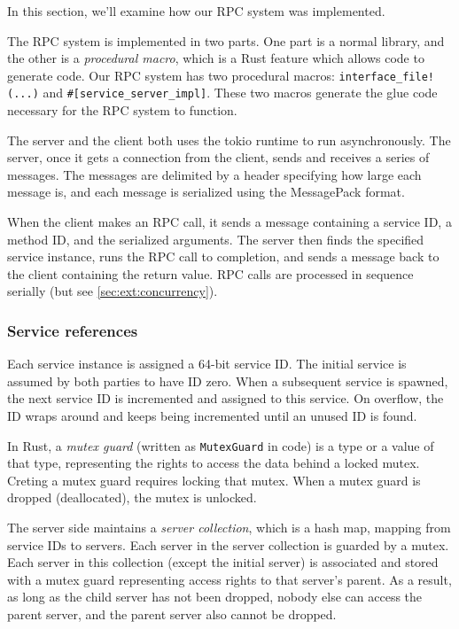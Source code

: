 \documentclass[11pt, twocolumn]{article}
\begin{document}
In this section, we'll examine how our RPC system was implemented.

The RPC system is implemented in two parts. One part is a normal library, and the other is a \textit{procedural macro}, which is a Rust feature which allows code to generate code. Our RPC system has two procedural macros: \texttt{interface\_file!(...)} and \texttt{\#[service\_server\_impl]}. These two macros generate the glue code necessary for the RPC system to function.

The server and the client both uses the tokio\cite{tokio} runtime to run asynchronously. The server, once it gets a connection from the client, sends and receives a series of messages. The messages are delimited by a header specifying how large each message is, and each message is serialized using the MessagePack\cite{msgpack} format.

When the client makes an RPC call, it sends a message containing a service ID, a method ID, and the serialized arguments. The server then finds the specified service instance, runs the RPC call to completion, and sends a message back to the client containing the return value. RPC calls are processed in sequence serially (but see \cref{sec:ext:concurrency}).

\subsubsection{Service references} \label{sec:impl:returning-services}

Each service instance is assigned a 64-bit service ID. The initial service is assumed by both parties to have ID zero. When a subsequent service is spawned, the next service ID is incremented and assigned to this service. On overflow, the ID wraps around and keeps being incremented until an unused ID is found.

In Rust, a \textit{mutex guard} (written as \texttt{MutexGuard} in code) is a type or a value of that type, representing the rights to access the data behind a locked mutex. Creting a mutex guard requires locking that mutex. When a mutex guard is dropped (deallocated), the mutex is unlocked.

The server side maintains a \textit{server collection}, which is a hash map, mapping from service IDs to servers. Each server in the server collection is guarded by a mutex. Each server in this collection (except the initial server) is associated and stored with a mutex guard representing access rights to that server's parent. As a result, as long as the child server has not been dropped, nobody else can access the parent server, and the parent server also cannot be dropped.
\end{document}
